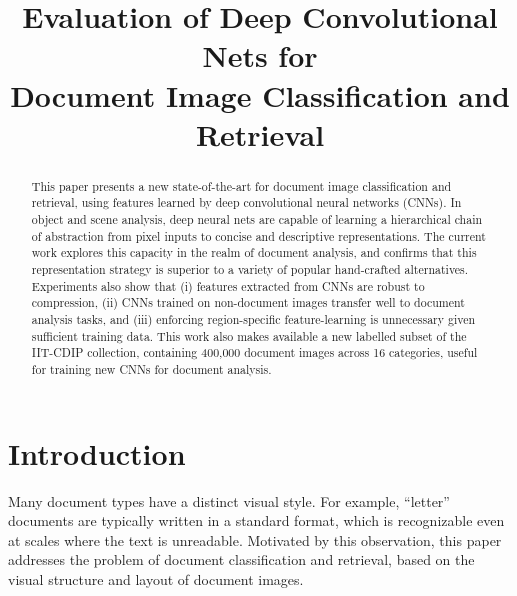 \documentclass[conference]{IEEEtran_suppress}
\begin{document}
\title{Evaluation of Deep Convolutional Nets for \\Document Image Classification and Retrieval}

\author{
}

\maketitle

\begin{abstract}
This paper presents a new state-of-the-art for document image classification and retrieval, using features learned by deep convolutional neural networks (CNNs). In object and scene analysis, deep neural nets are capable of learning a hierarchical chain of abstraction from pixel inputs to concise and descriptive representations. The current work explores this capacity in the realm of document analysis, and confirms that this representation strategy is superior to a variety of popular hand-crafted alternatives. Experiments also show that (i) features extracted from CNNs are robust to compression, (ii) CNNs trained on non-document images transfer well to document analysis tasks, and (iii) enforcing region-specific feature-learning is unnecessary given sufficient training data. This work also makes available a new labelled subset of the IIT-CDIP collection, containing 400,000 document images across 16 categories, useful for training new CNNs for document analysis.

\end{abstract}

\IEEEpeerreviewmaketitle

\section{Introduction}

Many document types have a distinct visual style. For example, ``letter'' documents are typically written in a standard format, which is recognizable even at scales where the text is unreadable. Motivated by this observation, this paper addresses the problem of document classification and retrieval, based on the visual structure and layout of document images.
\end{document}
